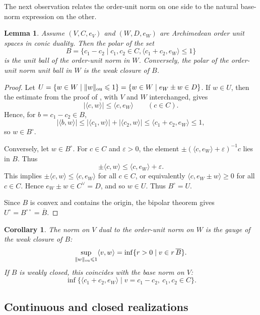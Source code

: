 \documentclass[11pt,onecolumn]{article}
\theoremstyle{plain}
\newtheorem{corollary}[corollary]{Corollary}
\newtheorem{lemma}[lemma]{Lemma}
\theoremstyle{definition}
\begin{document}
The next observation relates the order-unit norm on one side to the natural
base-norm expression on the other.

\begin{lemma}
Assume $(V,C,e_V)$ and $(W,D,e_W)$ are Archimedean order unit spaces in
conic duality. Then the polar of the set
\[
    B=\{c_1-c_2\mid c_1,c_2\in C,
    \langle c_1+c_2,e_W\rangle\leqslant 1\}
\] is the unit ball of the order-unit norm in $W$. Conversely, the polar of the order-unit norm unit ball in $W$ is the weak closure of $B$.
\end{lemma}
\begin{proof}
    Let $U=\{w\in W\mid \Vert w\Vert_{\rm ou}\leqslant 1\}=\{w\in W\mid e_W\pm w\in D\}$.
    If $w\in U$, then the estimate from the proof of
    , with $V$ and $W$ interchanged, gives
    \[
        |\langle c,w\rangle|\leqslant \langle c,e_W\rangle
        \qquad(c\in C).
    \]
    Hence, for $b=c_1-c_2\in B$,
    \[
        |\langle b,w\rangle|\leqslant
        |\langle c_1,w\rangle|+|\langle c_2,w\rangle|\leqslant
        \langle c_1+c_2,e_W\rangle\leqslant 1,
    \]
    so $w\in B^\circ$.

    Conversely, let $w\in B^\circ$.  For $c\in C$ and $\varepsilon>0$, the
    element $\pm(\langle c,e_W\rangle+\varepsilon)^{-1}c$ lies in $B$.  Thus
    \[
        \pm \langle c,w\rangle\leqslant \langle c,e_W\rangle+\varepsilon.
    \]
    This implies
    $\pm\langle c,w\rangle\leqslant \langle c,e_W\rangle$ for all $c\in C$, or equivalently $\langle c,e_W\pm w\rangle\geqslant 0$ for all $c\in C$. Hence $e_W\pm w\in C^\vee=D$, and so $w\in U$. Thus $B^\circ=U$.

    Since $B$ is convex and contains the origin, the bipolar theorem gives
    $U^\circ=B^{\circ\circ}=\overline{B}$.
\end{proof}

\begin{corollary}
The norm on $V$ dual to the order-unit norm on $W$ is the gauge of the weak
closure of $B$:
\[
    \sup_{\Vert w\Vert_{\rm ou}\leqslant 1}\langle v,w\rangle
    =\inf\{r>0\mid v\in r\,\overline{B}\}.
\]
If $B$ is weakly closed, this coincides with the base norm on $V$:
\[
    \inf\{\langle c_1+c_2,e_W\rangle\mid v=c_1-c_2,\ c_1,c_2\in C\}.
\]
\end{corollary}

\fi

\subsection{Continuous and closed realizations}
\end{document}
